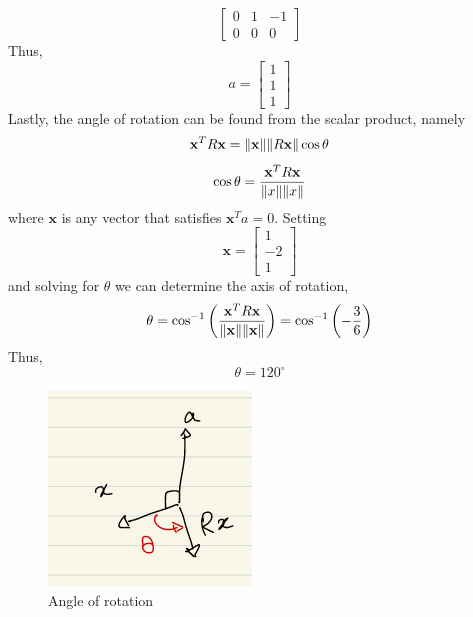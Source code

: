 \begin{mdframed}[style=MyFrame]
\begin{equation}
\begin{bmatrix}
            0   &   1   &   -1  \\
            0   &   0   &   0
        \end{bmatrix}
    \end{equation}
    Thus,
    \begin{equation}
        a =
        \begin{bmatrix}
            1   \\
            1   \\
            1
        \end{bmatrix}
    \end{equation}
    Lastly, the angle of rotation can be found from the scalar product,
    namely
    \begin{equation}
        \mathbf{x}^{T}R\mathbf{x} = \norm{\mathbf{x}} \norm{R\mathbf{x}}\cos \theta
    \end{equation}
    \begin{equation}
        \cos \theta =
                        \frac{\mathbf{x}^{T}R\mathbf{x}}
                                {\norm{x}\norm{x}}
    \end{equation}
    where $\mathbf{x}$ is any vector that satisfies $\mathbf{x}^{T}a=0$.
    Setting
    \begin{equation}
        \mathbf{x} =
        \begin{bmatrix}
            1   \\
            -2   \\
            1
        \end{bmatrix}
    \end{equation}
    and solving for $\theta$ we can determine the axis of rotation,
    \begin{equation}
        \theta  =
                \cos^{-1}
                    \left(\frac{\mathbf{x}^{T}R\mathbf{x}}{\norm{\mathbf{x}}\norm{\mathbf{x}}}\right)
                    =
                    \cos^{-1}\left( -\frac{3}{6}\right)
    \end{equation}
    Thus,
    \begin{equation}
        \theta = 120^{\circ}
    \end{equation}
    \begin{figure}[H]
        \includegraphics[height=0.35\textheight]{media/angle.png}
        \caption{Angle of rotation}
        \label{fig:angle}
    \end{figure}

\end{mdframed}
